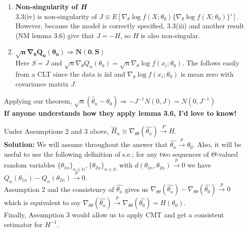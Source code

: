 \documentclass[11pt,letterpaper]{article}                  %
\begin{document}
\begin{problem}
\begin{enumerate}
\item \textbf{Non-singularity of \textit{H}} \\
3.3(iv) is non-singularity of $J \equiv E[\nabla_{\theta} \log
f(X;\theta_0) \{\nabla_{\theta} \log f(X;\theta_0)\}']$. However,
because the model is correctly specified, 3.3(iii)
and another result (NM lemma 3.6) give that $J = -H$, so $H$ is also
non-singular.

\item $\mathbf{\sqrt{n}\nabla_{\theta}Q_n(\theta_0) \Rightarrow
    N(0,S)}$ \\
  Here $S= J$ and
  $\sqrt{n}\nabla_{\theta}Q_n(\theta_0) = \sqrt{n}
  \overline{\nabla_{\theta}\log f(x_i; \theta_0)}$. The follows
  easily from a CLT since the data is iid and
  $\nabla_{\theta}\log f(x_i; \theta_0)$ is mean zero with covariance
  matrix $J$.
\end{enumerate}
Applying our theorem, $\sqrt{n}(\hat{\theta}_n - \theta_0) \Rightarrow
-J^{-1} N(0, J) = N(0, J^{-1})$ \\


\textbf{If anyone understands how they apply lemma 3.6, I'd love to know!}


\end{problem}

\bigskip
\begin{problem}
\end{problem}

\bigskip
\begin{problem}
Under Assumptions 2 and 3 above, $\hat{H}_n \equiv \nabla_{\theta\theta}(\widehat{\theta_n}) \overset{P}{\rightarrow} H$.\\

\textbf{Solution:} We will assume throughout the answer that $\widehat{\theta_n}\overset{p}{\rightarrow}\theta_0$. Also, it will be useful to use the following definition of s.e.; for any two sequences of $\Theta$-valued random variables $\{\theta_{1n}\}_{n\in\mathbb{N}}, \{\theta_{2n}\}_{n\in\mathbb{N}}$ with $d(\theta_{1n},\theta_{2n})\overset{p}{\rightarrow}0$ we have $Q_n(\theta_{1n}) - Q_n(\theta_{2n})\overset{p}{\rightarrow}0$.\\

Assumption 2 and the consistency of $\widehat{\theta_n}$ gives us $\nabla_{\theta\theta}(\widehat{\theta_n}) - \nabla_{\theta\theta}(\widehat{\theta_0}) \overset{p}{\rightarrow}0$ which is equivalent to say $\nabla_{\theta\theta}(\widehat{\theta_n}) \overset{p}{\rightarrow} \nabla_{\theta\theta}(\widehat{\theta_0}) = H(\theta_0)$.\\

Finally, Assumption 3 would allow us to apply CMT and get a consistent estimator for $H^{-1}$.
\end{problem}
\end{document}
